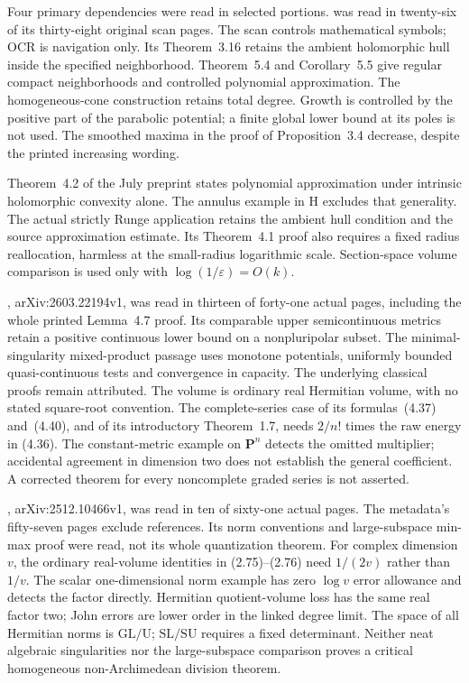 Four primary dependencies were read in selected portions.
\cite{Zeriahi91ParabolicPublished} was read in twenty-six of its
thirty-eight original scan pages. The scan controls mathematical
symbols; OCR is navigation only. Its Theorem~3.16 retains the
ambient holomorphic hull inside the specified neighborhood.
Theorem~5.4 and Corollary~5.5 give regular compact neighborhoods
and controlled polynomial approximation. The homogeneous-cone
construction retains total degree. Growth is controlled by the
positive part of the parabolic potential; a finite global lower
bound at its poles is not used. The smoothed maxima in the proof
of Proposition~3.4 decrease, despite the printed increasing
wording.

Theorem~4.2 of the July preprint states polynomial approximation
under intrinsic holomorphic convexity alone. The annulus example
in H excludes that generality. The actual strictly Runge
application retains the ambient hull condition and the source
approximation estimate. Its Theorem~4.1 proof also requires a
fixed radius reallocation, harmless at the small-radius
logarithmic scale. Section-space volume comparison is used only
with $\log(1/\varepsilon)=O(k)$.

\cite{Finski26Kodaira}, arXiv:2603.22194v1, was read in
thirteen of forty-one actual pages, including the whole printed
Lemma~4.7 proof. Its comparable upper semicontinuous metrics
retain a positive continuous lower bound on a nonpluripolar
subset. The minimal-singularity mixed-product passage uses
monotone potentials, uniformly bounded quasi-continuous tests
and convergence in capacity. The underlying classical proofs
remain attributed. The volume is ordinary real Hermitian
volume, with no stated square-root convention. The complete-series
case of its formulas~(4.37) and~(4.40), and of its introductory
Theorem~1.7, needs $2/n!$ times the raw energy in (4.36).
The constant-metric example on $\mathbf P^n$ detects the omitted
multiplier; accidental agreement in dimension two does not
establish the general coefficient. A corrected theorem for every
noncomplete graded series is not asserted.

\cite{Finski25BigQuantizationV1}, arXiv:2512.10466v1, was read in
ten of sixty-one actual pages. The metadata's fifty-seven pages
exclude references. Its norm conventions and large-subspace
min-max proof were read, not its whole quantization theorem.
For complex dimension $v$, the ordinary real-volume identities
in (2.75)--(2.76) need $1/(2v)$ rather than $1/v$. The scalar
one-dimensional norm example has zero $\log v$ error allowance
and detects the factor directly. Hermitian quotient-volume loss
has the same real factor two; John errors are lower order in the
linked degree limit. The space of all Hermitian norms is
$\mathrm{GL}/\mathrm U$; $\mathrm{SL}/\mathrm{SU}$ requires
a fixed determinant. Neither neat algebraic singularities nor
the large-subspace comparison proves a critical homogeneous
non-Archimedean division theorem.

